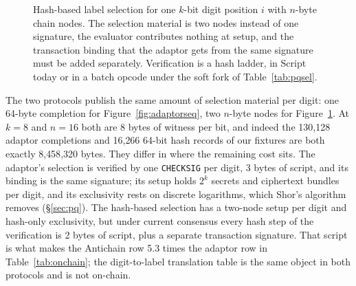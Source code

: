 \documentclass[11pt]{article}
\begin{document}
\begin{figure}[p]
\caption{Hash-based label selection for one $k$-bit digit position $i$ with
$n$-byte chain nodes. The selection material is two nodes instead of one
signature, the evaluator contributes nothing at setup, and the transaction
binding that the adaptor gets from the same signature must be added separately.
Verification is a hash ladder, in Script today or in a batch opcode under the
soft fork of Table~\ref{tab:pqsel}.}
\label{fig:hashseq}
\end{figure}

The two protocols publish the same amount of selection material per digit:
one 64-byte completion for Figure~\ref{fig:adaptorseq}, two $n$-byte nodes for
Figure~\ref{fig:hashseq}. At $k=8$ and $n=16$ both are 8 bytes of
witness per bit, and indeed the 130{,}128 adaptor completions and 16{,}266
64-bit hash records of our fixtures are both exactly 8{,}458{,}320 bytes. They
differ in where the remaining cost sits. The adaptor's selection is verified by
one \texttt{CHECKSIG} per digit, 3 bytes of script, and its binding is the same
signature; its setup holds $2^k$ secrets and ciphertext bundles per digit, and
its exclusivity rests on discrete logarithms, which Shor's algorithm removes
(\S\ref{sec:pq}). The hash-based selection has a two-node setup per digit and
hash-only exclusivity, but under current consensus every hash step of the
verification is 2 bytes of script, plus a separate transaction signature. That
script is what makes the Antichain row 5.3 times the adaptor row in
Table~\ref{tab:onchain}; the digit-to-label translation table is the same
object in both protocols and is not on-chain.
\end{document}
